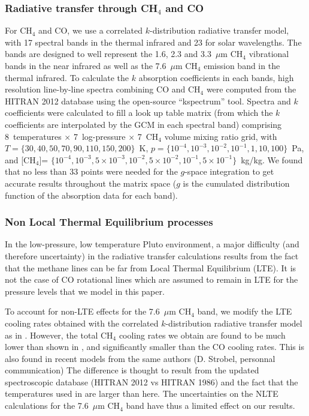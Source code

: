 \subsubsection{Radiative transfer through CH$_4$ and CO}
For CH$_4$ and CO, we use a correlated $k$-distribution radiative transfer model, 
with 17 spectral bands in the thermal infrared and 23 for solar wavelengths. The bands are
designed to well represent the 1.6, 2.3 and 3.3~$\mu$m CH$_4$ vibrational bands in the near
infrared as well as the 7.6~$\mu$m CH$_4$ emission band in the thermal infrared.
To calculate the $k$ absorption coefficients in each bands, 
high resolution line-by-line spectra combining CO and CH$_4$  
were computed from the HITRAN 2012 database using the open-source ``kspectrum'' tool.
Spectra and $k$ coefficients were calculated to fill
a look up table matrix (from which the $k$ coefficients are interpolated by the GCM in each
spectral band) comprising  8~temperatures $\times$ 7~log-pressure $\times$
7~CH$_4$ volume mixing ratio grid, with 
$T=\{30, 40, 50, 70, 90, 110, 150, 200\}$~K, 
$p=\{10^{-4}, 10^{-3}, 10^{-2}, 10^{-1}, 1, 10, 100\}$~Pa, and
[CH$_4$]= $\{10^{-4},  10^{-3}, 5\times10^{-3},
10^{-2}, 5\times10^{-2},
10^{-1}, 5\times10^{-1}\}$~kg/kg. 
We found that no less than 33 points were needed for the $g$-space integration to get accurate
results throughout the matrix space ($g$ is the cumulated distribution
function of the absorption data for each band).  

\subsubsection{Non Local Thermal Equilibrium processes}
In the low-pressure, low temperature Pluto environment, a major difficulty (and therefore
uncertainty) in the radiative transfer calculations results from the fact that the methane
lines can be far from Local Thermal Equilibrium (LTE). It is not the case of 
CO rotational lines which are assumed to
remain in LTE for the pressure levels that we model in this paper. 

To account for non-LTE effects for the 7.6~$\mu$m CH$_4$ band, we modify the LTE
cooling rates obtained with the correlated $k$-distribution radiative transfer model as in
\cite{Stro:96}. However, the total CH$_4$ cooling rates we obtain are found to be 
much lower than shown in \cite{Stro:96}, and significantly smaller than the CO cooling rates. 
This is also found in recent models from the same authors (D. Strobel, personnal communication)
The difference is thought to result from the updated spectroscopic database (HITRAN 2012 vs
HITRAN 1986) and the fact that the temperatures used in \cite{Stro:96}  are larger than here.
The uncertainties on the NLTE calculations for the 7.6~$\mu$m CH$_4$ band have thus 
a limited effect on our results.

